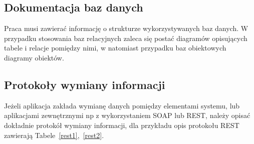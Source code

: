 \documentclass[12pt,a4paper]{article}
\begin{document}

\subsection{Dokumentacja baz danych}
Praca musi zawierać informację o strukturze wykorzystywanych baz danych. W przypadku stosowania baz relacyjnych zaleca się postać diagramów opisujących tabele i relacje pomiędzy nimi, w natomiast przypadku baz obiektowych diagramy obiektów.




\subsection{Protokoły wymiany informacji}
Jeżeli aplikacja zakłada wymianę danych pomiędzy elementami systemu, lub aplikacjami zewnętrznymi np z wykorzystaniem SOAP lub REST, należy opisać dokładnie protokół wymiany informacji, dla przykładu opis protokołu REST zawierają Tabele~\ref{rest1},~\ref{rest2}.
\end{document}
